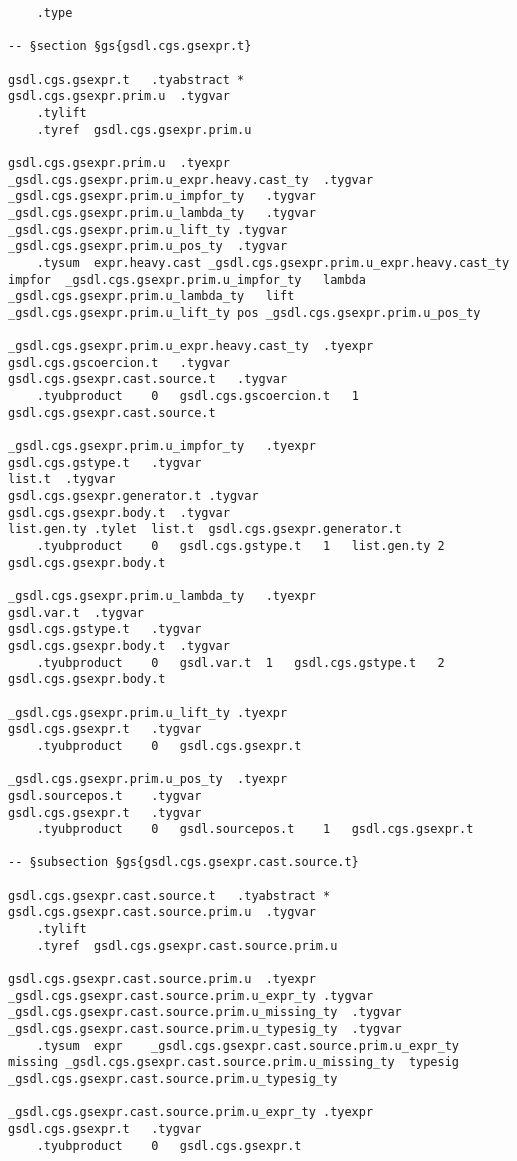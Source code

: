\documentclass{report}
\begin{document}
\begin{verbatim}
	.type

-- §section §gs{gsdl.cgs.gsexpr.t}

gsdl.cgs.gsexpr.t	.tyabstract	*
gsdl.cgs.gsexpr.prim.u	.tygvar
	.tylift
	.tyref	gsdl.cgs.gsexpr.prim.u

gsdl.cgs.gsexpr.prim.u	.tyexpr
_gsdl.cgs.gsexpr.prim.u_expr.heavy.cast_ty	.tygvar
_gsdl.cgs.gsexpr.prim.u_impfor_ty	.tygvar
_gsdl.cgs.gsexpr.prim.u_lambda_ty	.tygvar
_gsdl.cgs.gsexpr.prim.u_lift_ty	.tygvar
_gsdl.cgs.gsexpr.prim.u_pos_ty	.tygvar
	.tysum	expr.heavy.cast	_gsdl.cgs.gsexpr.prim.u_expr.heavy.cast_ty	impfor	_gsdl.cgs.gsexpr.prim.u_impfor_ty	lambda	_gsdl.cgs.gsexpr.prim.u_lambda_ty	lift	_gsdl.cgs.gsexpr.prim.u_lift_ty	pos	_gsdl.cgs.gsexpr.prim.u_pos_ty

_gsdl.cgs.gsexpr.prim.u_expr.heavy.cast_ty	.tyexpr
gsdl.cgs.gscoercion.t	.tygvar
gsdl.cgs.gsexpr.cast.source.t	.tygvar
	.tyubproduct	0	gsdl.cgs.gscoercion.t	1	gsdl.cgs.gsexpr.cast.source.t

_gsdl.cgs.gsexpr.prim.u_impfor_ty	.tyexpr
gsdl.cgs.gstype.t	.tygvar
list.t	.tygvar
gsdl.cgs.gsexpr.generator.t	.tygvar
gsdl.cgs.gsexpr.body.t	.tygvar
list.gen.ty	.tylet	list.t	gsdl.cgs.gsexpr.generator.t
	.tyubproduct	0	gsdl.cgs.gstype.t	1	list.gen.ty	2	gsdl.cgs.gsexpr.body.t

_gsdl.cgs.gsexpr.prim.u_lambda_ty	.tyexpr
gsdl.var.t	.tygvar
gsdl.cgs.gstype.t	.tygvar
gsdl.cgs.gsexpr.body.t	.tygvar
	.tyubproduct	0	gsdl.var.t	1	gsdl.cgs.gstype.t	2	gsdl.cgs.gsexpr.body.t

_gsdl.cgs.gsexpr.prim.u_lift_ty	.tyexpr
gsdl.cgs.gsexpr.t	.tygvar
	.tyubproduct	0	gsdl.cgs.gsexpr.t

_gsdl.cgs.gsexpr.prim.u_pos_ty	.tyexpr
gsdl.sourcepos.t	.tygvar
gsdl.cgs.gsexpr.t	.tygvar
	.tyubproduct	0	gsdl.sourcepos.t	1	gsdl.cgs.gsexpr.t

-- §subsection §gs{gsdl.cgs.gsexpr.cast.source.t}

gsdl.cgs.gsexpr.cast.source.t	.tyabstract	*
gsdl.cgs.gsexpr.cast.source.prim.u	.tygvar
	.tylift
	.tyref	gsdl.cgs.gsexpr.cast.source.prim.u

gsdl.cgs.gsexpr.cast.source.prim.u	.tyexpr
_gsdl.cgs.gsexpr.cast.source.prim.u_expr_ty	.tygvar
_gsdl.cgs.gsexpr.cast.source.prim.u_missing_ty	.tygvar
_gsdl.cgs.gsexpr.cast.source.prim.u_typesig_ty	.tygvar
	.tysum	expr	_gsdl.cgs.gsexpr.cast.source.prim.u_expr_ty	missing	_gsdl.cgs.gsexpr.cast.source.prim.u_missing_ty	typesig	_gsdl.cgs.gsexpr.cast.source.prim.u_typesig_ty

_gsdl.cgs.gsexpr.cast.source.prim.u_expr_ty	.tyexpr
gsdl.cgs.gsexpr.t	.tygvar
	.tyubproduct	0	gsdl.cgs.gsexpr.t


\end{verbatim}
\end{document}
